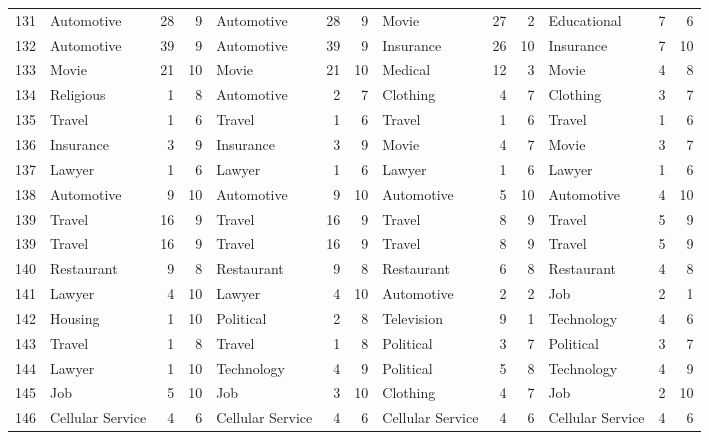 \begin{figure}[htbp]
\begin{tabular}{rlrrlrrlrrlrr}
    131   & Automotive & 28    & 9     & Automotive & 28    & 9     & Movie & 27    & 2     & Educational & 7     & 6 \\
    132   & Automotive & 39    & 9     & Automotive & 39    & 9     & Insurance & 26    & 10    & Insurance & 7     & 10 \\
    133   & Movie & 21    & 10    & Movie & 21    & 10    & Medical & 12    & 3     & Movie & 4     & 8 \\
    134   & Religious & 1     & 8     & Automotive & 2     & 7     & Clothing & 4     & 7     & Clothing & 3     & 7 \\
    135   & Travel & 1     & 6     & Travel & 1     & 6     & Travel & 1     & 6     & Travel & 1     & 6 \\
    136   & Insurance & 3     & 9     & Insurance & 3     & 9     & Movie & 4     & 7     & Movie & 3     & 7 \\
    137   & Lawyer & 1     & 6     & Lawyer & 1     & 6     & Lawyer & 1     & 6     & Lawyer & 1     & 6 \\
    138   & Automotive & 9     & 10    & Automotive & 9     & 10    & Automotive & 5     & 10    & Automotive & 4     & 10 \\
    139   & Travel & 16    & 9     & Travel & 16    & 9     & Travel & 8     & 9     & Travel & 5     & 9 \\
    139   & Travel & 16    & 9     & Travel & 16    & 9     & Travel & 8     & 9     & Travel & 5     & 9 \\
    140   & Restaurant & 9     & 8     & Restaurant & 9     & 8     & Restaurant & 6     & 8     & Restaurant & 4     & 8 \\
    141   & Lawyer & 4     & 10    & Lawyer & 4     & 10    & Automotive & 2     & 2     & Job   & 2     & 1 \\
    142   & Housing & 1     & 10    & Political & 2     & 8     & Television & 9     & 1     & Technology & 4     & 6 \\
    143   & Travel & 1     & 8     & Travel & 1     & 8     & Political & 3     & 7     & Political & 3     & 7 \\
    144   & Lawyer & 1     & 10    & Technology & 4     & 9     & Political & 5     & 8     & Technology & 4     & 9 \\
    145   & Job   & 5     & 10    & Job   & 3     & 10    & Clothing & 4     & 7     & Job   & 2     & 10 \\
    146   & Cellular Service & 4     & 6     & Cellular Service & 4     & 6     & Cellular Service & 4     & 6     & Cellular Service & 4     & 6 \\

\end{tabular}
\end{figure}

